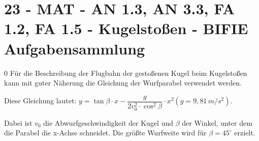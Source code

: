 \section{23 - MAT - AN 1.3, AN 3.3, FA 1.2, FA 1.5 - Kugelstoßen - BIFIE Aufgabensammlung}

\begin{langesbeispiel} \item[0] %
				Für die Beschreibung der Flugbahn der gestoßenen Kugel beim Kugelstoßen kann mit guter Näherung die Gleichung der Wurfparabel verwendet werden.
				
				Diese Gleichung lautet: $y=\tan\beta\cdot x-\dfrac{g}{2v_0^2\cdot \cos^2\beta}\cdot x^2 (g=9,81\,m/s^2)$.
				
				Dabei ist $v_0$ die Abwurfgeschwindigkeit der Kugel und $\beta$ der Winkel, unter dem die Parabel die x-Achse schneidet. Die größte Wurfweite wird für $\beta=45^\circ$ erzielt.
				

\end{langesbeispiel}
